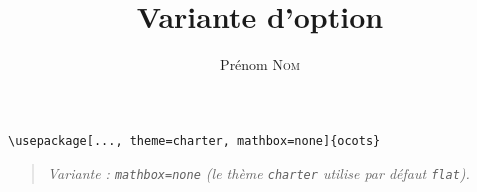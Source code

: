 \documentclass[11pt]{ocots-book}
\title{Variante d'option}
\author{Prénom \textsc{Nom}}
\newcommand{\ocotsvariantnote}[1]{\begin{quote}\itshape Variante : #1\end{quote}}
\begin{document}
\maketitle

\begin{lstlisting}
\usepackage[..., theme=charter, mathbox=none]{ocots}
\end{lstlisting}
\ocotsvariantnote{\texttt{mathbox=none} (le th\`eme \texttt{charter} utilise par d\'efaut \texttt{flat}).}

\end{document}
